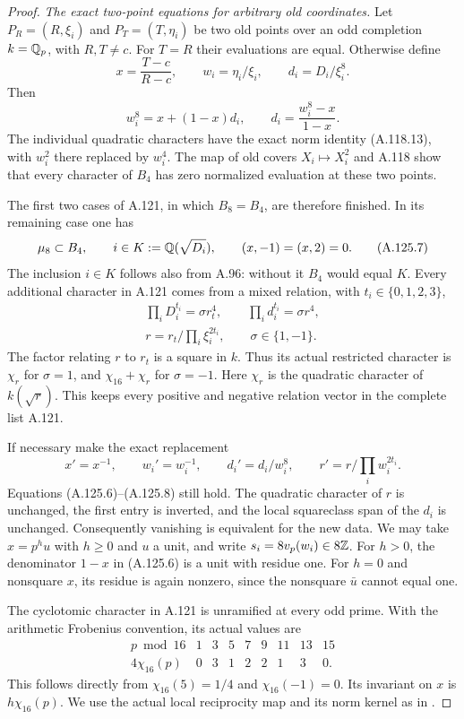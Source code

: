 \begin{proof}
\emph{The exact two-point equations for arbitrary old coordinates.}
Let $P_R=(R,\xi_i)$ and $P_T=(T,\eta_i)$ be two old
points over an odd completion $k=\mathbb Q_p$, with $R,T\ne c$.
For $T=R$ their evaluations are equal.
Otherwise define
\[
 x=\frac{T-c}{R-c},\qquad w_i=\eta_i/\xi_i,
       \qquad d_i=D_i/\xi_i^8.
\tag{A.125.5}
\]
Then
\[
             w_i^8=x+(1-x)d_i,
             \qquad d_i=\frac{w_i^8-x}{1-x}.
\tag{A.125.6}
\]
The individual quadratic characters have the exact
norm identity (A.118.13), with $w_i^2$ there replaced
by $w_i^4$.
The map of old covers $X_i\mapsto X_i^2$ and A.118
show that every character of $B_4$ has zero normalized
evaluation at these two points.

The first two cases of A.121, in which $B_8=B_4$, are
therefore finished.
In its remaining case one has
\[
 \mu_8\subset B_4,\qquad i\in K:=\mathbb Q(\sqrt{D_i}),
                    \qquad (x,-1)=(x,2)=0.
\tag{A.125.7}
\]
The inclusion $i\in K$ follows also from A.96: without
it $B_4$ would equal $K$.
Every additional character in A.121 comes from a
mixed relation, with $t_i\in\{0,1,2,3\}$,
\[
 \begin{gathered}
 \prod_iD_i^{t_i}=\sigma r_t^4,\qquad
 \prod_i d_i^{t_i}=\sigma r^4,\\
 r=r_t/\prod_i\xi_i^{2t_i},\qquad \sigma\in\{1,-1\}.
 \end{gathered}
\tag{A.125.8}
\]
The factor relating $r$ to $r_t$ is a square in $k$.
Thus its actual restricted character is $\chi_r$ for
$\sigma=1$, and $\chi_{16}+\chi_r$ for $\sigma=-1$.
Here $\chi_r$ is the quadratic character of $k(\sqrt r)$.
This keeps every positive and negative relation vector
in the complete list A.121.

If necessary make the exact replacement
\[
 x'=x^{-1},\qquad w_i'=w_i^{-1},\qquad
 d_i'=d_i/w_i^8,\qquad r'=r/\prod_iw_i^{2t_i}.
\tag{A.125.9}
\]
Equations (A.125.6)--(A.125.8) still hold.
The quadratic character of $r$ is unchanged, the
first entry is inverted, and the local squareclass
span of the $d_i$ is unchanged.
Consequently vanishing is equivalent for the new data.
We may take
$x=p^h u$ with $h\ge0$ and $u$ a unit, and write
$s_i=8v_p(w_i)\in8\mathbb Z$.
For $h>0$, the denominator $1-x$ in (A.125.6) is
a unit with residue one.
For $h=0$ and nonsquare $x$, its residue is again
nonzero, since the nonsquare $\bar u$ cannot equal one.

The cyclotomic character in A.121 is unramified at
every odd prime.  With the arithmetic Frobenius
convention, its actual values are
\[
\begin{array}{c|rrrrrrrr}
 p\bmod16&1&3&5&7&9&11&13&15\\ \hline
 4\chi_{16}(p)&0&3&1&2&2&1&3&0.
\end{array}
\tag{A.125.10}
\]
This follows directly from $\chi_{16}(5)=1/4$ and
$\chi_{16}(-1)=0$.
Its invariant on $x$ is $h\chi_{16}(p)$.
We use the actual local reciprocity map and its norm
kernel as in \cite[Theorem 4.1.2]{BIR_KedlayaCFT}.


\end{proof}

